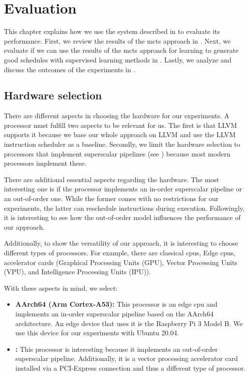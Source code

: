 \chapter{Evaluation}
\label{sec:eval}
This chapter explains how we use the system described in  to evaluate its performance.
First, we review the results of the \ac{mcts} approach in .
Next, we evaluate if we can use the results of the \ac{mcts} approach for learning to generate good schedules with supervised learning methods in .
Lastly, we analyze and discuss the outcomes of the experiments in .

\section{Hardware selection}
\label{sec:eval:hw}
There are different aspects in choosing the hardware for our experiments.
A processor must fulfill two aspects to be relevant for us.
The first is that LLVM supports it because we base our whole approach on LLVM and use the LLVM instruction scheduler as a baseline.
Secondly, we limit the hardware selection to processors that implement superscalar pipelines (see ) because most modern processors implement these.

There are additional essential aspects regarding the hardware.
The most interesting one is if the processor implements an in-order superscalar pipeline or an out-of-order one.
While the former comes with no restrictions for our experiments, the latter can reschedule instructions during execution.
Followingly, it is interesting to see how the out-of-order model influences the performance of our approach.

Additionally, to show the versatility of our approach, it is interesting to choose different types of processors.
For example, there are classical \acp{cpu}, Edge \acp{cpu}, accelerator cards (\eg Graphical Processing Units (GPU), Vector Processing Units (VPU), and Intelligence Processing Units (IPU)).

With these aspects in mind, we select:
\begin{itemize}
    \item \textbf{AArch64 (Arm Cortex-A53):} This processor is an edge \ac{cpu} and implements an in-order superscalar pipeline based on the AArch64 architecture.
    An edge device that uses it is the Raspberry Pi 3 Model B.
    We use this device for our experiments with Ubuntu 20.04.
    \item \textbf{\aurora:} This processor is interesting because it implements an out-of-order superscalar pipeline. 
    Additionally, it is a vector processing accelerator card installed via a PCI-Express connection and thus a different type of processor.
\end{itemize}

